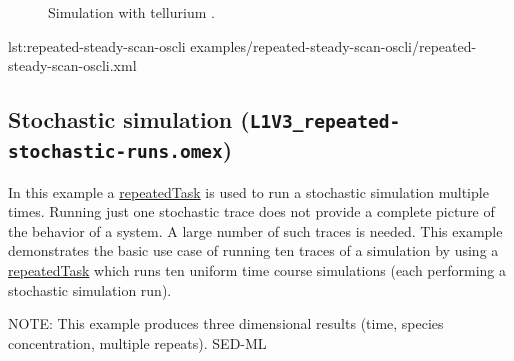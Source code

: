 \begin{figure}[ht!]
\begin{minipage}{0.47\textwidth}
        \caption{Simulation with tellurium \citep{tellurium}.}
    \end{minipage}
    \label{fig:repeated-steady-scan-oscli}
\end{figure}

{lst:repeated-steady-scan-oscli}
{examples/repeated-steady-scan-oscli/repeated-steady-scan-oscli.xml}


\subsection{Stochastic simulation (\texttt{L1V3\_repeated-stochastic-runs.omex})}
In this example a \hyperref[class:repeatedTask]{repeatedTask} is used to run a stochastic simulation multiple times.
Running just one stochastic trace does not provide a complete picture of the behavior of a system. A large number of such traces is needed. This example demonstrates the basic use case of running ten traces of a simulation by using a \hyperref[class:repeatedTask]{repeatedTask} which runs ten uniform time course simulations (each performing a stochastic simulation run).

NOTE: This example produces three dimensional results (time, species concentration, multiple repeats). SED-ML \currentLV {}

